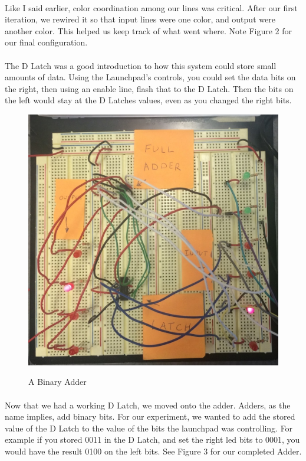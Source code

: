 \documentclass[12pt,a4paper]{report}
\begin{document}
\paragraph{}
Like I said earlier, color coordination among our lines was critical. After our first iteration, we rewired it so that input lines were one color, and output were another color. This helped us keep track of what went where. Note Figure 2 for our final configuration.  

\paragraph{}
The D Latch was a good introduction to how this system could store small amounts of data. Using the Launchpad's controls, you could set the data bits on the right, then using an enable line, flash that to the D Latch. Then the bits on the left would stay at the D Latches values, even as you changed the right bits. 

\begin{figure}
	\centering
	\includegraphics[scale=.3]{img/finished_adder} \\
	\caption{A Binary Adder	}
\end{figure}

\paragraph{}
Now that we had a working D Latch, we moved onto the adder. Adders, as the name implies, add binary bits. For our experiment, we wanted to add the stored value of the D Latch to the value of the bits the launchpad was controlling. For example if you stored 0011 in the D Latch, and set the right led bits to 0001, you would have the result 0100 on the left bits. See Figure 3 for our completed Adder. 
\end{document}
